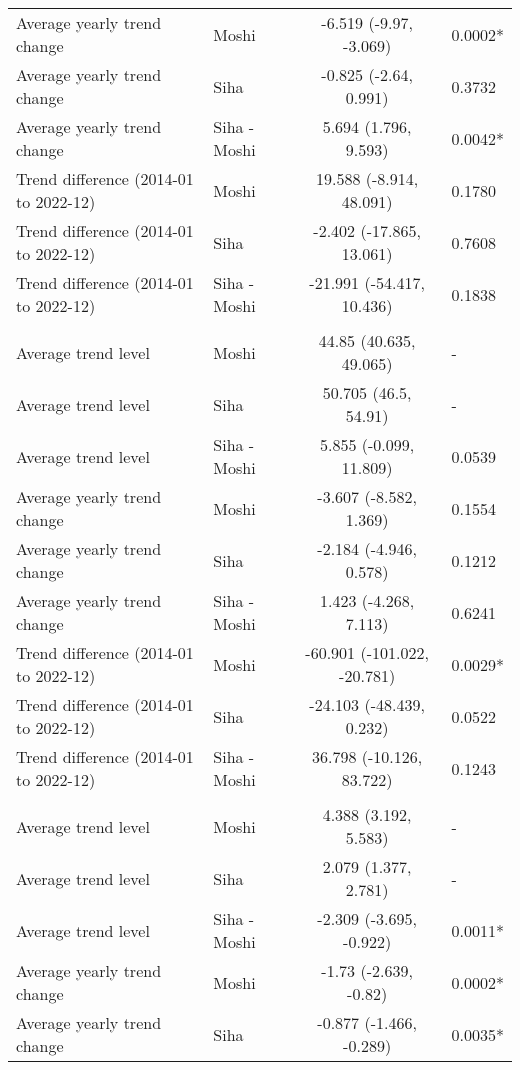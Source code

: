 \begin{longtable}{l|lcl}
Average yearly trend change & Moshi & -6.519 (-9.97, -3.069) & 0.0002* \\ 
Average yearly trend change & Siha & -0.825 (-2.64, 0.991) & 0.3732 \\ 
Average yearly trend change & Siha - Moshi & 5.694 (1.796, 9.593) & 0.0042* \\ 
Trend difference (2014-01 to 2022-12) & Moshi & 19.588 (-8.914, 48.091) & 0.1780 \\ 
Trend difference (2014-01 to 2022-12) & Siha & -2.402 (-17.865, 13.061) & 0.7608 \\ 
Trend difference (2014-01 to 2022-12) & Siha - Moshi & -21.991 (-54.417, 10.436) & 0.1838 \\ 
\midrule\addlinespace[2.5pt]
\multicolumn{4}{l}{Road Traffic Accidents} \\[2.5pt] 
\midrule\addlinespace[2.5pt]
Average trend level & Moshi & 44.85 (40.635, 49.065) & - \\ 
Average trend level & Siha & 50.705 (46.5, 54.91) & - \\ 
Average trend level & Siha - Moshi & 5.855 (-0.099, 11.809) & 0.0539 \\ 
Average yearly trend change & Moshi & -3.607 (-8.582, 1.369) & 0.1554 \\ 
Average yearly trend change & Siha & -2.184 (-4.946, 0.578) & 0.1212 \\ 
Average yearly trend change & Siha - Moshi & 1.423 (-4.268, 7.113) & 0.6241 \\ 
Trend difference (2014-01 to 2022-12) & Moshi & -60.901 (-101.022, -20.781) & 0.0029* \\ 
Trend difference (2014-01 to 2022-12) & Siha & -24.103 (-48.439, 0.232) & 0.0522 \\ 
Trend difference (2014-01 to 2022-12) & Siha - Moshi & 36.798 (-10.126, 83.722) & 0.1243 \\ 
\midrule\addlinespace[2.5pt]
\multicolumn{4}{l}{Schistosomiasis} \\[2.5pt] 
\midrule\addlinespace[2.5pt]
Average trend level & Moshi & 4.388 (3.192, 5.583) & - \\ 
Average trend level & Siha & 2.079 (1.377, 2.781) & - \\ 
Average trend level & Siha - Moshi & -2.309 (-3.695, -0.922) & 0.0011* \\ 
Average yearly trend change & Moshi & -1.73 (-2.639, -0.82) & 0.0002* \\ 
Average yearly trend change & Siha & -0.877 (-1.466, -0.289) & 0.0035* \\ 

\end{longtable}
